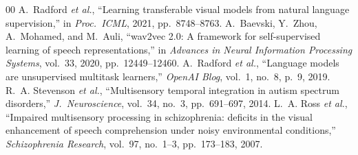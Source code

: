 \documentclass[conference]{IEEEtran}
\begin{document}
\begin{thebibliography}{00}
 A.~Radford \textit{et al.}, ``Learning transferable visual models from natural language supervision,'' in \textit{Proc.~ICML}, 2021, pp.~8748--8763.
 A.~Baevski, Y.~Zhou, A.~Mohamed, and M.~Auli, ``wav2vec 2.0: A framework for self-supervised learning of speech representations,'' in \textit{Advances in Neural Information Processing Systems}, vol.~33, 2020, pp.~12449--12460.
 A.~Radford \textit{et al.}, ``Language models are unsupervised multitask learners,'' \textit{OpenAI Blog}, vol.~1, no.~8, p.~9, 2019.
 R.~A. Stevenson \textit{et al.}, ``Multisensory temporal integration in autism spectrum disorders,'' \textit{J.~Neuroscience}, vol.~34, no.~3, pp.~691--697, 2014.
 L.~A. Ross \textit{et al.}, ``Impaired multisensory processing in schizophrenia: deficits in the visual enhancement of speech comprehension under noisy environmental conditions,'' \textit{Schizophrenia Research}, vol.~97, no.~1--3, pp.~173--183, 2007.
\end{thebibliography}
\end{document}
